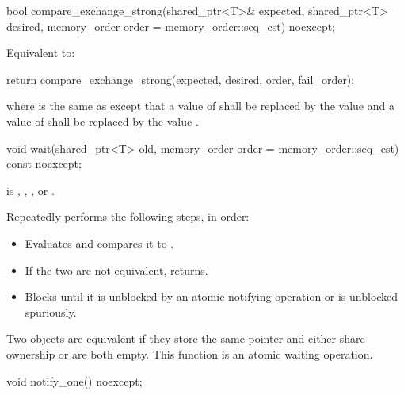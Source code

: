 %
\begin{itemdecl}
bool compare_exchange_strong(shared_ptr<T>& expected, shared_ptr<T> desired,
                             memory_order order = memory_order::seq_cst) noexcept;
\end{itemdecl}

\begin{itemdescr}
\pnum
\effects
Equivalent to:
\begin{codeblock}
return compare_exchange_strong(expected, desired, order, fail_order);
\end{codeblock}
where  is the same as 
except that a value of 
shall be replaced by the value  and
a value of 
shall be replaced by the value .
\end{itemdescr}

%
\begin{itemdecl}
void wait(shared_ptr<T> old, memory_order order = memory_order::seq_cst) const noexcept;
\end{itemdecl}

\begin{itemdescr}
\pnum
\expects
{} is
,
,
, or
.

\pnum
\effects
Repeatedly performs the following steps, in order:
\begin{itemize}
\item
  Evaluates  and compares it to .
\item
  If the two are not equivalent, returns.
\item
  Blocks until it
  is unblocked by an atomic notifying operation or is unblocked spuriously.
\end{itemize}

\pnum
\remarks
Two  objects are equivalent
if they store the same pointer and either share ownership or are both empty.
This function is an atomic waiting operation.
\end{itemdescr}

%
\begin{itemdecl}
void notify_one() noexcept;
\end{itemdecl}

